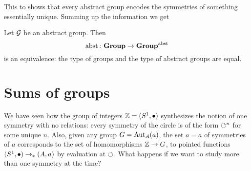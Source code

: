 This to shows that every abstract group encodes the symmetries of something essentially unique.  Summing up the information we get
\begin{theorem}
  \label{lem:Groupsareidentitytypes}Let ${\mathcal G}$ be an abstract group.  
Then
$$\mathrm{abst}:\mathbf{Group}\to\mathbf{Group}^{\mathrm{abst}}$$ is an equivalence: \ie the type of groups and the type of abstract groups are equal.
\end{theorem}

\section{Sums of groups}
\label{sec:coprod}
We have seen how the group of integers $\mathbb{Z}=(S^1,\bullet)$ synthesizes the notion of one symmetry with no relations: every symmetry of the circle is of the form $\circlearrowleft^n$ for some unique $n$.  Also, given any group $G=\mathrm{Aut}_A(a)$, the set $a=a$ of symmetries of $a$ corresponds to the set of homomorphisms $\mathbb{Z}\to G$, \ie to pointed functions $(S^1,\bullet)\to_*(A,a)$ by evaluation at $\circlearrowleft$.  What happens if we want to study more than one symmetry at the time?  

